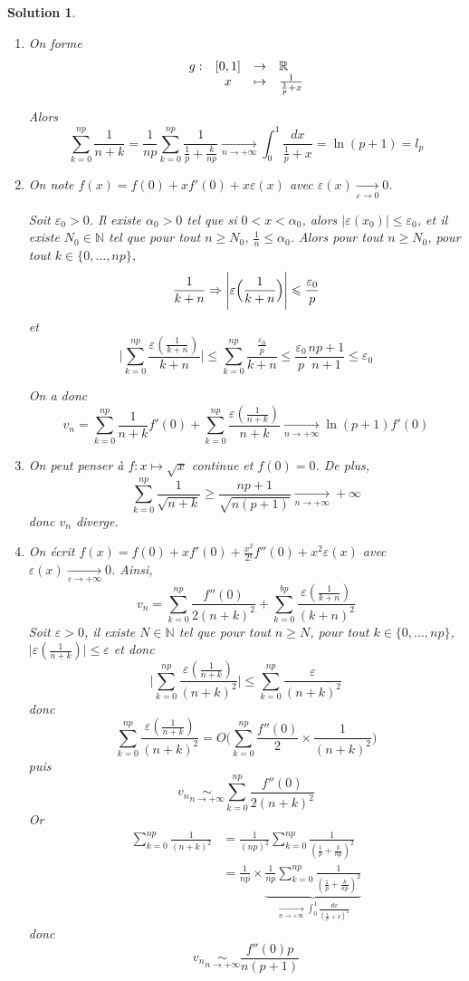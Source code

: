 \documentclass[12pt]{article}
\newtheorem{solution}{Solution}[section]
\theoremstyle{remark}
\newcommand{\N}{\mathbb{N}} \newcommand{\Z}{\mathbb{Z}}
\newcommand{\function}[5]{
	$$
	\begin{array}{rccl}
		#1: & #2 & \to & #3 \\
		& #4 & \mapsto & #5
	\end{array}
	$$
}
\numberwithin{equation}{section}
\begin{document}
\begin{solution}
	\phantom{}
	\begin{enumerate}
		\item On forme \function{g}{[0,1]}{\R}{x}{\frac{1}{\frac{1}{p}+x}}
		Alors 
		$$\sum_{k=0}^{np}\frac{1}{n+k}=\frac{1}{np}\sum_{k=0}^{np}\frac{1}{\frac{1}{p}+\frac{k}{np}}\xrightarrow[n\to+\infty]{}\int_{0}^{1}\frac{dx}{\frac{1}{p}+x}=\ln(p+1)=l_{p}$$

		\item On note $f(x)=f(0)+xf'(0)+x\varepsilon(x)$ avec $\varepsilon(x)\xrightarrow[\varepsilon\to0]{}0$. 
		
		Soit $\varepsilon_{0}>0$. Il existe $\alpha_{0}>0$ tel que si $0<x<\alpha_{0}$, alors $\vert\varepsilon(x_{0})\vert\leqslant\varepsilon_{0}$, et il existe $N_{0}\in\N$ tel que pour tout $n\geqslant N_{0}$, $\frac{1}{n}\leqslant\alpha_{0}$. Alors pour tout $n\geqslant N_{0}$, pour tout $k\in\{0,\dots,np\}$, 
		$$\frac{1}{k+n}\Rightarrow \Biggl\vert\varepsilon\Bigl(\frac{1}{k+n}\Bigr)\Biggr\vert\leqslant\frac{\varepsilon_{0}}{p}$$
		et
		$$\Biggl\vert\sum_{k=0}^{np}\frac{\varepsilon(\frac{1}{k+n})}{k+n}\Biggr\vert\leqslant\sum_{k=0}^{np}\frac{\frac{\varepsilon_{0}}{p}}{k+n}\leqslant\frac{\varepsilon_{0}}{p}\frac{np+1}{n+1}\leqslant\varepsilon_{0}$$

		On a donc
		$$v_{n}=\sum_{k=0}^{np}\frac{1}{n+k}f'(0)+\sum_{k=0}^{np}\frac{\varepsilon(\frac{1}{n+k})}{n+k}\xrightarrow[n\to+\infty]{}\ln(p+1)f'(0)$$

		\item On peut penser à $f\colon x\mapsto\sqrt{x}$ continue et $f(0)=0$. De plus,
		$$\sum_{k=0}^{np}\frac{1}{\sqrt{n+k}}\geqslant\frac{np+1}{\sqrt{n(p+1)}}\xrightarrow[n\to+\infty]{}+\infty$$
		donc $v_{n}$ diverge.

		\item On écrit $f(x)=f(0)+xf'(0)+\frac{x^{2}}{2!}f''(0)+x^{2}\varepsilon(x)$ avec $\varepsilon(x)\xrightarrow[\varepsilon\to+\infty]{}0$. Ainsi, 
		$$v_{n}=\sum_{k=0}^{np}\frac{f''(0)}{2(n+k)^{2}}+\sum_{k=0}^{bp}\frac{\varepsilon(\frac{1}{k+n})}{(k+n)^{2}}$$
		Soit $\varepsilon>0$, il existe $N\in\N$ tel que pour tout $n\geqslant N$, pour tout $k\in\{0,\dots,np\}$, $\vert\varepsilon(\frac{1}{n+k})\vert\leqslant\varepsilon$ et donc 
		$$\Biggl\vert\sum_{k=0}^{np}\frac{\varepsilon(\frac{1}{n+k})}{(n+k)^{2}}\Biggr\vert\leqslant\sum_{k=0}^{np}\frac{\varepsilon}{(n+k)^{2}}$$
		donc 
		$$\sum_{k=0}^{np}\frac{\varepsilon(\frac{1}{n+k})}{(n+k)^{2}}=O\Biggl(\sum_{k=0}^{np}\frac{f''(0)}{2}\times\frac{1}{(n+k)^{2}}\Biggr)$$
		puis
		$$v_{n}\underset{n\to+\infty}{\sim}\sum_{k=0}^{np}\frac{f''(0)}{2(n+k)^{2}}$$
		Or 
		\begin{align*}
			\sum_{k=0}^{np}\frac{1}{(n+k)^{2}}
			&=\frac{1}{(np)^{2}}\sum_{k=0}^{np}\frac{1}{(\frac{1}{p}+\frac{k}{np})^{2}}\\
			&=\frac{1}{np}\times \underbrace{\frac{1}{np}\sum_{k=0}^{np}\frac{1}{(\frac{1}{p}+\frac{k}{np})^{2}}}_{\xrightarrow[n\to+\infty]{}\int_{0}^{1}\frac{dx}{(\frac{1}{p}+x)^{2}}}
		\end{align*}
		donc 
		$$v_{n}\underset{n\to+\infty}{\sim}\frac{f''(0)p}{n(p+1)}$$
	\end{enumerate}
\end{solution}
\end{document}
